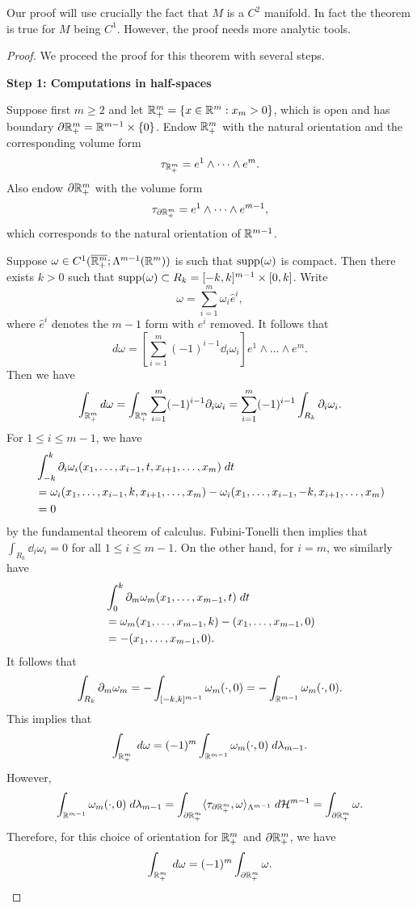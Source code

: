 \documentclass[a4paper]{article}
\begin{document}
\begin{remark}
Our proof will use crucially the fact that $M$ is a $C^2$
manifold. In fact the theorem is true for $M$ being
$C^1$. However, the proof needs more analytic tools.
\end{remark}

\begin{proof}
We proceed the proof for this theorem with several steps.

\textbf{Step 1: Computations in half-spaces}

Suppose first $m \geq 2$ and let
$\mathbb{R}^m_+ = \{x \in \mathbb{R}^m : x_m > 0\}$, which is open
and has boundary
$\partial \mathbb{R}^m_+ = \mathbb{R}^{m-1} \times \{0\}$. Endow $\mathbb{R}^m_+$ with
the natural orientation and the corresponding volume
form
\[
\tau_{\mathbb{R}^m_+} = e^1 \wedge \dots \wedge e^m.
\]
Also endow $\partial \mathbb{R}^m_+$ with the volume form
\[
\tau_{\partial \mathbb{R}^m_+} = e^1 \wedge \dots \wedge e^{m-1},
\]
which corresponds to the natural orientation of $\mathbb{R}^{m-1}$.

Suppose $\omega \in C^1 (\overline{\mathbb{R}^{m}_+} ; \Lambda^{m-1}
(\mathbb{R}^m))$ is such that $\operatorname{supp}(\omega)$ is compact.
Then there exists $k > 0$ such that $\operatorname{supp} (\omega)
\subset R_k = [-k, k]^{m-1} \times [0, k]$.
Write
\[
\omega = \sum_{i=1}^m \omega_i \hat{e}^i,
\]
where $\hat{e}^i$ denotes the $m-1$ form with $e^i$ removed.
It follows that
\[
d \omega = \left[ \sum_{i=1}^m (-1)^{i-1} \dd_i \omega_i
\right] e^1 \wedge \dots \wedge e^m.
\]
Then we have
\[
\int_{\mathbb{R}^m_+} d \omega =
\int_{\mathbb{R}^m_+} \sum_{i=1}^m (-1)^{i-1} \partial_i \omega_i
= \sum_{i=1}^m (-1)^{i-1} \int_{R_k} \partial_i \omega_i.
\]
For $1 \leq i \leq m - 1$, we have
\[
\begin{aligned}
  &\int_{-k}^k \partial_i \omega_i (x_1, \dots, x_{i-1},
  t, x_{i+1}, \dots, x_m) \; d t \\
  &= \omega_i (x_1, \dots, x_{i-1}, k, x_{i+1}, \dots, x_m)
  - \omega_i (x_1, \dots, x_{i-1}, -k, x_{i+1}, \dots, x_m) \\
  &= 0
\end{aligned}
\]
by the fundamental theorem of calculus.
Fubini-Tonelli then implies that $\int_{R_k} \dd_i \omega_i
= 0$ for all $1 \leq i \leq m - 1$. On the other hand,
for $i = m$, we similarly have
\[
\begin{aligned}
&\int_0^k \partial_m \omega_m (x_1, \dots, x_{m-1}, t) \; d t \\
&= \omega_m (x_1, \dots, x_{m-1}, k)
- (x_1, \dots, x_{m-1}, 0) \\
&= - (x_1, \dots, x_{m-1}, 0).
\end{aligned}
\]
It follows that
\[
\int_{R_k} \partial_m \omega_m
= - \int_{[-k, k]^{m-1}} \omega_m (\cdot, 0)
= - \int_{\mathbb{R}^{m-1}} \omega_m (\cdot, 0).
\]
This implies that
\[
\int_{\mathbb{R}^m_+} \; d \omega
= (-1)^m \int_{\mathbb{R}^{m-1}} \omega_m (\cdot, 0) \; d \lambda_{m-1}.
\]
However,
\[
\int_{\mathbb{R}^{m-1}} \omega_m (\cdot, 0) \; d \lambda_{m-1}
= \int_{\partial \mathbb{R}^m_+} \langle \tau_{\partial \mathbb{R}^m_+}, \omega
\rangle_{\Lambda^{m-1}}
\; d \mathcal{H}^{m-1}
= \int_{\partial \mathbb{R}^{m}_+} \omega.
\]
Therefore, for this choice of orientation for $\mathbb{R}^m_+$
and $\partial \mathbb{R}^m_+$, we have
\[
\int_{\mathbb{R}^m_+} \; d \omega = (-1)^m \int_{\partial \mathbb{R}^m_+} \omega.
\]


\end{proof}
\end{document}
